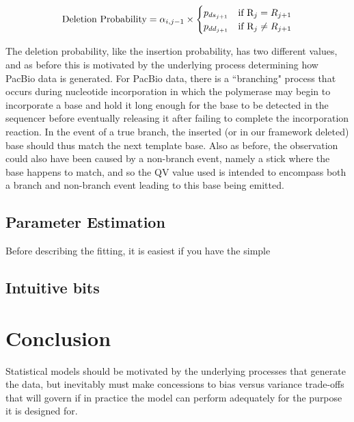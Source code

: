 \documentclass[fleqn,10pt]{SelfArx} %
\begin{document}
\begin{dmath}
	\text{Deletion Probability} = \alpha_{i,j-1}  \\
	\times  \begin{cases}
				p_{ds_{j+1}}  & \text{if }  \text{R}_{j} = R_{j+1} \\
				p_{dd_{j+1}} & \text{if }  \text{R}_{j} \neq R_{j+1} 
				\end{cases}
\end{dmath}



The deletion probability, like the insertion probability, has two different values, and as before this is motivated by the underlying process determining how PacBio data is generated.  For PacBio data, there is a ``branching" process that occurs during nucleotide incorporation in which the polymerase may begin to incorporate a base and hold it long enough for the base to be detected in the sequencer before eventually releasing it after failing to complete the incorporation reaction.  In the event of a true branch, the inserted (or in our framework deleted) base should thus match the next template base.  Also as before, the observation could also have been caused by a non-branch event, namely a stick where the base happens to match, and so the QV value used is intended to encompass both a branch and non-branch event leading to this base being emitted.


\subsection{Parameter Estimation}

Before describing the fitting, it is easiest if you have the simple   

\subsection{Intuitive bits}





\section{Conclusion}

Statistical models should be motivated by the underlying processes that generate the data, but inevitably must make concessions to bias versus variance trade-offs that will govern if in practice the model can perform adequately for the purpose it is designed for.
\end{document}
